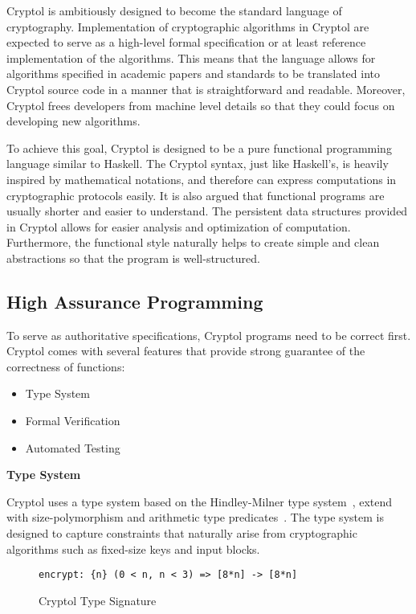 \documentclass[a4paper, notitlepage]{report}
\renewcommand{\paragraph}[1]{\vspace*{1em}\noindent\textbf{#1}\hspace*{1em}}
\begin{document}
Cryptol is ambitiously designed to become the standard language of cryptography.
Implementation of cryptographic algorithms in Cryptol are expected to serve as 
a high-level formal specification or at least reference implementation 
of the algorithms.
This means that the language allows for algorithms specified in academic
papers and standards to be translated into Cryptol source code in a manner that
is straightforward and readable.
Moreover, Cryptol frees developers from machine level details
so that they could focus on developing new algorithms.

To achieve this goal, Cryptol is designed to be a pure functional programming
language similar to Haskell. The Cryptol syntax, just like Haskell's, is
heavily inspired by mathematical notations, and therefore can express computations
in cryptographic protocols easily.
It is also argued that functional programs
are usually shorter and easier to understand.
The persistent data structures provided in Cryptol
allows for easier analysis and optimization of computation. Furthermore,
the functional style naturally helps to create simple and clean abstractions so
that the program is well-structured. 

\subsection{High Assurance Programming}

To serve as authoritative specifications, Cryptol programs need
to be correct first. Cryptol comes with several features that provide strong
guarantee of the correctness of functions:
\begin{itemize}
\item Type System
\item Formal Verification 
\item Automated Testing
\end{itemize}

\paragraph{Type System}

Cryptol uses a type system based on the Hindley-Milner
type system~\cite{hindley1969principal}, extend with size-polymorphism
and arithmetic type predicates~\cite{lewis2003cryptol}. The type system
is designed to capture constraints that naturally arise from cryptographic
algorithms such as fixed-size keys and input blocks.

\begin{figure}
\begin{lstlisting}[frame=single]
encrypt: {n} (0 < n, n < 3) => [8*n] -> [8*n]
\end{lstlisting}
\caption{Cryptol Type Signature}
\label{fig:type}
\end{figure}
\end{document}
